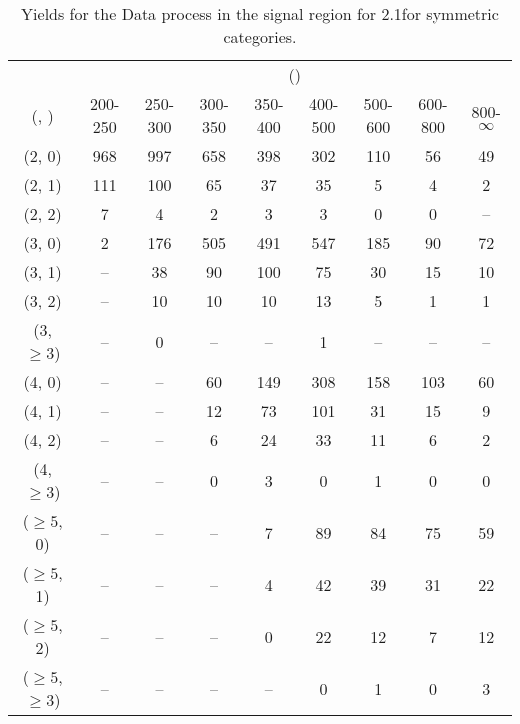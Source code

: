\begin{table}[h!]
\tiny
\centering
\caption{Yields for the Data process in the signal region for 2.1\ifb for symmetric categories.\label{tab:yieldssep_sig_data_sym}}
\begin{tabular}
{ccccccccc}
	\hline\hline
	& \multicolumn{8}{c}{\scalht (\gev)} \\ 
	 (\njet,  \nb) & 200-250 & 250-300 & 300-350 & 350-400 & 400-500 & 500-600 & 600-800 & 800-$\infty$ \\ [0.8ex] 
\hline
	(2, 0) & 968 & 997 & 658 & 398 & 302 & 110 & 56 & 49 \\[0.5ex] 
	(2, 1) & 111 & 100 & 65 & 37 & 35 & 5 & 4 & 2 \\[0.5ex] 
	(2, 2) & 7 & 4 & 2 & 3 & 3 & 0 & 0 & -- \\[0.5ex] 
	(3, 0) & 2 & 176 & 505 & 491 & 547 & 185 & 90 & 72 \\[0.5ex] 
	(3, 1) & -- & 38 & 90 & 100 & 75 & 30 & 15 & 10 \\[0.5ex] 
	(3, 2) & -- & 10 & 10 & 10 & 13 & 5 & 1 & 1 \\[0.5ex] 
	(3, $\ge3$) & -- & 0 & -- & -- & 1 & -- & -- & -- \\[0.5ex] 
	(4, 0) & -- & -- & 60 & 149 & 308 & 158 & 103 & 60 \\[0.5ex] 
	(4, 1) & -- & -- & 12 & 73 & 101 & 31 & 15 & 9 \\[0.5ex] 
	(4, 2) & -- & -- & 6 & 24 & 33 & 11 & 6 & 2 \\[0.5ex] 
	(4, $\ge3$) & -- & -- & 0 & 3 & 0 & 1 & 0 & 0 \\[0.5ex] 
	($\ge5$, 0) & -- & -- & -- & 7 & 89 & 84 & 75 & 59 \\[0.5ex] 
	($\ge5$, 1) & -- & -- & -- & 4 & 42 & 39 & 31 & 22 \\[0.5ex] 
	($\ge5$, 2) & -- & -- & -- & 0 & 22 & 12 & 7 & 12 \\[0.5ex] 
	($\ge5$, $\ge3$) & -- & -- & -- & -- & 0 & 1 & 0 & 3 \\[0.5ex] 
	\hline
	\hline
\end{tabular}
\end{table}
